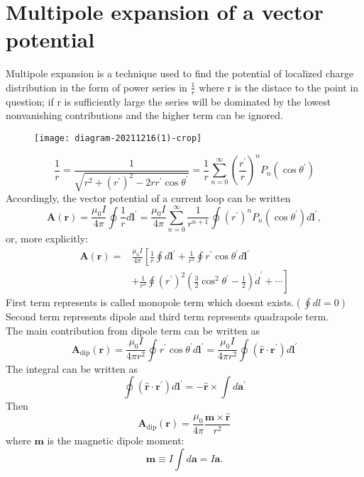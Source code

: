 \section{Multipole expansion of a vector potential}
Multipole expansion is a technique used to find the potential of localized charge distribution in the form of power series in $\frac{1}{r}$ where r is the distace to the point in question; if r is sufficiently large the series will be dominated by the lowest nonvanishing contributions and the higher term can be ignored.\\
\begin{figure}[H]
	\centering
	\texttt{[image: diagram-20211216(1)-crop]}
	\caption{}
	\label{}
\end{figure}
$$\frac{1}{r}=\frac{1}{\sqrt{r^{2}+\left(r^{\prime}\right)^{2}-2 r r^{\prime} \cos \theta^{\prime}}}=\frac{1}{r} \sum_{n=0}^{\infty}\left(\frac{r^{\prime}}{r}\right)^{n} P_{n}\left(\cos \theta^{\prime}\right)$$
 Accordingly, the vector potential of a current loop can be written
 $$
 \mathbf{A}(\mathbf{r})=\frac{\mu_{0} I}{4 \pi} \oint \frac{1}{r} d \mathbf{l}^{\prime}=\frac{\mu_{0} I}{4 \pi} \sum_{n=0}^{\infty} \frac{1}{r^{n+1}} \oint\left(r^{\prime}\right)^{n} P_{n}\left(\cos \theta^{\prime}\right) d \mathbf{l}^{\prime},
 $$
 or, more explicitly:
 $$
 \begin{aligned}
 \mathbf{A}(\mathbf{r})=& \frac{\mu_{0} I}{4 \pi}\left[\frac{1}{r} \oint d \mathbf{l}^{\prime}+\frac{1}{r^{2}} \oint r^{\prime} \cos \theta^{\prime} d \mathbf{l}^{\prime}\right.\\
 &\left.+\frac{1}{r^{3}} \oint\left(r^{\prime}\right)^{2}\left(\frac{3}{2} \cos ^{2} \theta^{\prime}-\frac{1}{2}\right) \dot{d}^{\prime}+\cdots\right]
 \end{aligned}
 $$
 First term represents is called monopole term which doesnt exists.$\left( \oint dl=0\right) $\\
 Second term represents dipole and third term represents quadrapole term.\\
 The main contribution from dipole term can be written as 
$$\mathbf{A}_{\mathrm{dip}}(\mathbf{r})=\frac{\mu_{0} I}{4 \pi r^{2}} \oint r^{\prime} \cos \theta^{\prime} d \mathbf{l}^{\prime}=\frac{\mu_{0} I}{4 \pi r^{2}} \oint\left(\hat{\mathbf{r}} \cdot \mathbf{r}^{\prime}\right) d \mathbf{l}^{\prime}$$ 
The integral can be written as \\
$$\oint\left(\hat{\mathbf{r}} \cdot \mathbf{r}^{\prime}\right) d \mathbf{l}^{\prime}=-\hat{\mathbf{r}} \times \int d \mathbf{a}^{\prime}$$
Then \\
$$\mathbf{A}_{\mathrm{dip}}(\mathbf{r})=\frac{\mu_{0}}{4 \pi} \frac{\mathbf{m} \times \hat{\mathbf{r}}}{r^{2}}$$
where $\mathbf{m}$ is the magnetic dipole moment:
$$
\mathbf{m} \equiv I \int d \mathbf{a}=I \mathbf{a} .
$$
